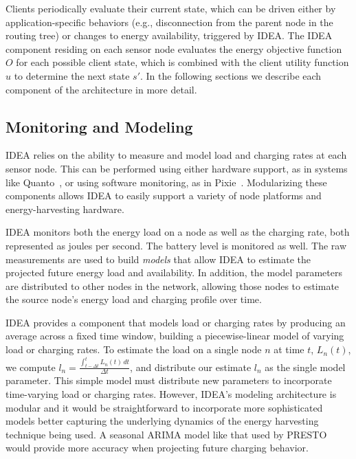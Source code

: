 Clients periodically evaluate their current state, which can be driven either
by application-specific behaviors (e.g., disconnection from the parent node
in the routing tree) or changes to energy availability, triggered by IDEA.
The IDEA component residing on each sensor node evaluates the energy
objective function $O$ for each possible client state, which is combined with
the client utility function $u$ to determine the next state $s'$. In the
following sections we describe each component of the architecture in more
detail.

\subsection{Monitoring and Modeling}

IDEA relies on the ability to measure and model load and charging rates at
each sensor node. This can be performed using either hardware support, as in
systems like Quanto~\cite{quanto-osdi08}, or using software monitoring, as in
Pixie~\cite{pixie-sensys08}. Modularizing these components allows IDEA to
easily support a variety of node platforms and energy-harvesting hardware.

IDEA monitors both the energy load on a node as well as the charging rate,
both represented as joules per second. The battery level is monitored as
well. The raw measurements are used to build \textit{models} that allow IDEA
to estimate the projected future energy load and availability. In addition,
the model parameters are distributed to other nodes in the network, allowing
those nodes to estimate the source node's energy load and charging profile
over time. 

IDEA provides a component that models load or charging rates by producing an
average across a fixed time window, building a piecewise-linear model of
varying load or charging rates. To estimate the load on a single node $n$ at
time $t$, $L_n(t)$, we compute $l_n = \frac{\int_{t - \Delta t}^t \! L_n(t)\,
dt}{\Delta t}$, and distribute our estimate $l_n$ as the single model
parameter. This simple model must distribute new parameters to incorporate
time-varying load or charging rates. However, IDEA's modeling architecture is
modular and it would be straightforward to incorporate more sophisticated
models better capturing the underlying dynamics of the energy harvesting
technique being used. A seasonal ARIMA model like that used by
PRESTO~\cite{presto-TON} would provide more accuracy when projecting future
charging behavior.

